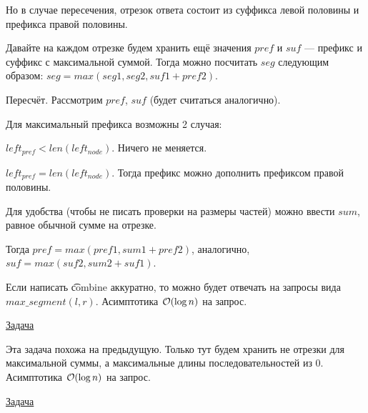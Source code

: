 Но в случае пересечения, отрезок ответа состоит из суффикса левой половины и префикса правой половины. 
\down

Давайте на каждом отрезке будем хранить ещё значения $pref$ и $suf$ --- префикс и суффикс с максимальной суммой. Тогда можно посчитать $seg$ следующим образом: $seg=max(seg1,seg2,suf1+pref2)$.

\begin{center}
	\begin{figure}[h]
	\end{figure}
\end{center}

Пересчёт. Рассмотрим $pref$, $suf$ (будет считаться аналогично).

Для максимальный префикса возможны 2 случая:

\up \up
\begin{MyList}[0pt]
	\item $left_{pref} < len(left_{node})$. Ничего не меняется.
	\item $left_{pref} = len(left_{node})$. Тогда префикс можно дополнить префиксом правой половины.
\end{MyList}
\up \up

Для удобства (чтобы не писать проверки на размеры частей) можно ввести $sum$, равное обычной сумме на отрезке.

Тогда $pref=max(pref1,sum1+pref2)$, аналогично, $suf=max(suf2,sum2+suf1)$.

Если написать \t{combine} аккуратно, то можно будет отвечать на запросы вида $max\_segment(l, r)$. Асимптотика $\mathcal{O}(\log n)$ на запрос.

 \href{https://informatics.mccme.ru/mod/statements/view3.php?chapterid=111798}{Задача}

Эта задача похожа на предыдущую. Только тут будем хранить не отрезки для максимальной суммы, а максимальные длины последовательностей из 0. Асимптотика $\mathcal{O}(\log n)$ на запрос.

 \href{https://informatics.mccme.ru/mod/statements/view.php?chapterid=113632}{Задача}

